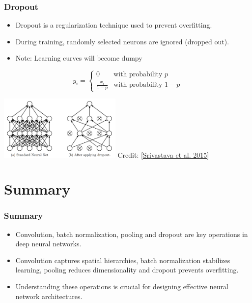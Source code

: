 \documentclass[aspectratio=169]{../latex_main/tntbeamer}  %
\begin{document}
    \begin{frame}
    \frametitle{Dropout}
    \begin{itemize}
        \item Dropout is a regularization technique used to prevent overfitting.
        \item During training, randomly selected neurons are ignored (dropped out).
        \item Note: Learning curves will become dumpy
    \end{itemize}
    \begin{equation}
        y_i = 
        \begin{cases} 
        0 & \text{with probability } p \\
        \frac{x_i}{1-p} & \text{with probability } 1-p 
        \end{cases}
    \end{equation}

    \centering
    \includegraphics[width=0.45\textwidth]{figure/dropout.png} Credit: [\href{https://jmlr.org/papers/volume15/srivastava14a/srivastava14a.pdf}{Srivastava et al. 2015}]

    \end{frame}
    
    \section{Summary}
    \begin{frame}
    \frametitle{Summary}
    \begin{itemize}
        \item Convolution, batch normalization, pooling and dropout are key operations in deep neural networks.
        \item Convolution captures spatial hierarchies, batch normalization stabilizes learning, pooling reduces dimensionality and dropout prevents overfitting.
        \item Understanding these operations is crucial for designing effective neural network architectures.
    \end{itemize}
    \end{frame}

    


 	
\end{document}
